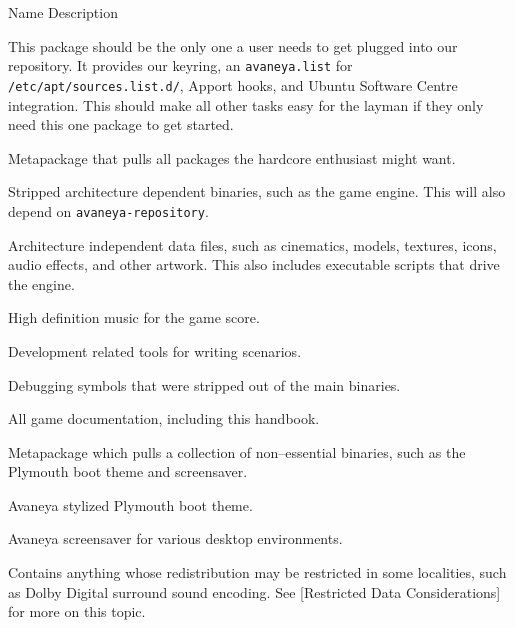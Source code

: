 {
    \bTABLE[split=repeat,option=stretch]
    \setupTABLE[column][2]
        [width=.65\textwidth,
        align=yes]
    \setupTABLE[row][each][align=center]
    \setupTABLE[7][1][align=center]

\bTABLEhead
    \bTR[bottomframe=on]
      \bTH  Name \eTH
      \bTH  Description \eTH
    \eTR
\eTABLEhead

\bTABLEbody
    \bTR
       \eTC
      \bTC This package should be the only one a user needs to get plugged into our repository. It provides our keyring, an {\tt avaneya.list} for {\tt /etc/apt/sources.list.d/}, Apport hooks, and Ubuntu Software Centre integration. This should make all other tasks easy for the layman if they only need this one package to get started. \eTC
    \eTR

    \bTR
       \eTC
      \bTC Metapackage that pulls all packages the hardcore enthusiast might want. \eTC
    \eTR

    \bTR
       \eTC
      \bTC Stripped architecture dependent binaries, such as the game engine. This will also depend on {\tt avaneya-repository}. \eTC
    \eTR

    \bTR
       \eTC
      \bTC Architecture independent data files, such as cinematics, models, 
textures, icons, audio effects, and other artwork. This also includes executable scripts 
that drive the engine. \eTC
    \eTR

    \bTR
       \eTC
      \bTC High definition music for the game score. \eTC
    \eTR

    \bTR
       \eTC
      \bTC Development related tools for writing scenarios. \eTC
    \eTR

    \bTR
       \eTC
      \bTC Debugging symbols that were stripped out of the main binaries. \eTC
    \eTR

    \bTR
       \eTC
      \bTC All game documentation, including this handbook. \eTC
    \eTR

    \bTR
       \eTC
      \bTC Metapackage which pulls a collection of non--essential binaries, such as the Plymouth boot theme and screensaver. \eTC
    \eTR

    \bTR
       \eTC
      \bTC Avaneya stylized Plymouth boot theme. \eTC
    \eTR
    
    \bTR
       \eTC
      \bTC Avaneya screensaver for various desktop environments. \eTC
    \eTR

    \bTR
       \eTC
      \bTC Contains anything whose redistribution may be restricted in some localities, such as Dolby Digital surround sound encoding. See [Restricted Data Considerations] for more on this topic. \eTC
    \eTR
\eTABLEbody
\eTABLE
}

